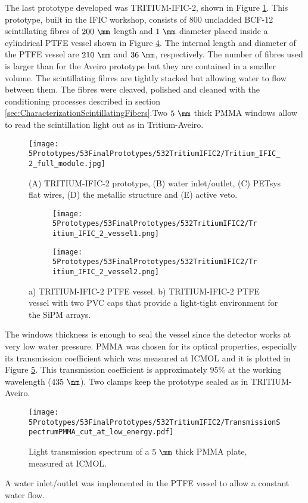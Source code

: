 The last prototype developed was TRITIUM-IFIC-2, shown in Figure \ref{fig:TritiumIFIC2}. This prototype, built in the IFIC workshop, consists of $800$ uncladded BCF-12 scintillating fibres of $200~\mm$ length and $1~\mm$ diameter placed inside a cylindrical PTFE vessel shown in Figure \ref{fig:Tritium-IFIC2_vessels}. The internal length and diameter of the PTFE vessel are $210~\mm$ and $36~\mm$, respectively. The number of fibres used is larger than for the Aveiro prototype but they are contained in a smaller volume. The scintillating fibres are tightly stacked but allowing water to flow between them. The fibres were cleaved, polished and cleaned with the conditioning processes described in section \ref{sec:CharacterizationScintillatingFibers}.Two $5~\mm$ thick PMMA windows allow to read the scintillation light out as in Tritium-Aveiro. 
\begin{figure}[h]
\centering
\texttt{[image: 5Prototypes/53FinalPrototypes/532TritiumIFIC2/Tritium\_IFIC\_2\_full\_module.jpg]}
\caption{(A) TRITIUM-IFIC-2 prototype, (B) water inlet/outlet, (C) PETsys flat wires, (D) the metallic structure and (E) active veto.\label{fig:TritiumIFIC2}}
\end{figure}
\begin{figure}
\centering
    \begin{subfigure}[b]{0.35\textwidth}
    \centering
    \texttt{[image: 5Prototypes/53FinalPrototypes/532TritiumIFIC2/Tritium\_IFIC\_2\_vessel1.png]}  
    \caption{\label{subfig:Tritium_IFIC_2_vessel}}
    \end{subfigure}
    \hfill
    \begin{subfigure}[b]{0.3\textwidth}
    \centering
    \texttt{[image: 5Prototypes/53FinalPrototypes/532TritiumIFIC2/Tritium\_IFIC\_2\_vessel2.png]}  
    \caption{\label{subfig:TritiumIFIC2_vessel_with_PVC_caps}}
    \end{subfigure}
 \caption{a) TRITIUM-IFIC-2 PTFE vessel. b) TRITIUM-IFIC-2 PTFE vessel with two PVC caps that provide a light-tight environment for the SiPM arrays.}
 \label{fig:Tritium-IFIC2_vessels}
\end{figure}
The windows thickness is enough to seal the vessel since the detector works at very low water pressure. PMMA was chosen for its optical properties, especially its transmission coefficient which was measured at ICMOL and it is plotted in Figure \ref{fig:PMMATransmissionSpectrum}. This transmission coefficient is approximately $95\%$ at the working wavelength ($435~\nm$). Two clamps keep the prototype sealed as in TRITIUM-Aveiro.
\begin{figure}[h]
\centering
\texttt{[image: 5Prototypes/53FinalPrototypes/532TritiumIFIC2/TransmissionSpectrumPMMA\_cut\_at\_low\_energy.pdf]}
\caption{Light transmission spectrum of a $5~\mm$ thick PMMA plate, measured at ICMOL. \label{fig:PMMATransmissionSpectrum}}
\end{figure}	
A water inlet/outlet was implemented in the PTFE vessel to allow a constant water flow. 

